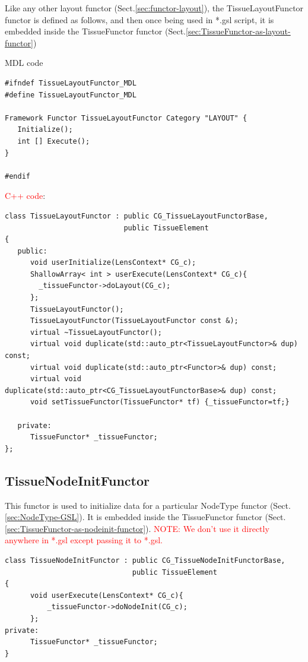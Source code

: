 Like any other layout functor (Sect.\ref{sec:functor-layout}), the
TissueLayoutFunctor functor is defined as follows, and then once being used in
*.gsl script, it is embedded inside the TissueFunctor functor
(Sect.\ref{sec:TissueFunctor-as-layout-functor})

MDL code
\begin{verbatim}
#ifndef TissueLayoutFunctor_MDL
#define TissueLayoutFunctor_MDL

Framework Functor TissueLayoutFunctor Category "LAYOUT" {
   Initialize();
   int [] Execute();
}

#endif
\end{verbatim}

\textcolor{red}{C++ code}:

{\small
\begin{lstlisting}
class TissueLayoutFunctor : public CG_TissueLayoutFunctorBase, 
                            public TissueElement
{
   public:
      void userInitialize(LensContext* CG_c);
      ShallowArray< int > userExecute(LensContext* CG_c){
      	_tissueFunctor->doLayout(CG_c);
      };
      TissueLayoutFunctor();
      TissueLayoutFunctor(TissueLayoutFunctor const &);
      virtual ~TissueLayoutFunctor();
      virtual void duplicate(std::auto_ptr<TissueLayoutFunctor>& dup) const;
      virtual void duplicate(std::auto_ptr<Functor>& dup) const;
      virtual void duplicate(std::auto_ptr<CG_TissueLayoutFunctorBase>& dup) const;
      void setTissueFunctor(TissueFunctor* tf) {_tissueFunctor=tf;}

   private:
      TissueFunctor* _tissueFunctor;
};
\end{lstlisting}
}

\subsection{TissueNodeInitFunctor}
\label{sec:TissueNodeInitFunctor}

This functor is used to initialize data for a particular NodeType functor
(Sect.\ref{sec:NodeType-GSL}). It is embedded inside the TissueFunctor functor
(Sect.\ref{sec:TissueFunctor-as-nodeinit-functor}). \textcolor{red}{NOTE: We
don't use it directly anywhere in *.gsl except passing it to *.gsl.}

{\small
\begin{lstlisting}
class TissueNodeInitFunctor : public CG_TissueNodeInitFunctorBase, 
                              public TissueElement
{
      void userExecute(LensContext* CG_c){
      	  _tissueFunctor->doNodeInit(CG_c);
      };
private:
      TissueFunctor* _tissueFunctor;   
}
\end{lstlisting}
}

